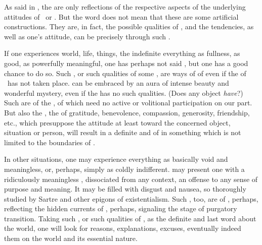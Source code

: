 {  \pa As said in , the  are only reflections of
  the respective aspects of the underlying attitudes of \yes\ or \No.  But the
  word  does not mean that these are some artificial
  constructions.  They are, in fact, the possible qualities of ,
  and the tendencies, as well as one's attitude, can be 
  precisely through such .
  
  \pa If one experiences world, life, things, the indefinite everything as
  fullness, as good, as powerfully meaningful, one has perhaps not said \yes,
  but one has a good chance to do so.  Such , or such qualities
  of some , are ways of  of  even if
  the  of \sch\ has not taken place.   
  can be embraced by an aura of intense beauty and wonderful mystery, even if
  the  has no such qualities.  (Does any object {\em have}?)
  Such  are  of the ,  of
   which need no active or volitional participation on our part.
  But also the , the  of gratitude, benevolence, compassion,
  generosity, friendship, etc., which presuppose the  attitude at least
  toward the  concerned object, situation or person, will result in
  a definite and   of  in something
  which is not limited to the boundaries of .
  
  \pa In other situations, one may experience everything as basically void and
  meaningless, or, perhaps, simply as coldly indifferent.  
   may present one with a ridiculously meaningless ,
  dissociated from any context, an offense to any sense of purpose and meaning.
  It may be filled with disgust and nausea, so thoroughly studied by Sartre and
  other epigons of existentialism.  Such , too, are 
  of , perhaps, reflecting the hidden currents of 
  \No, perhaps, signaling the stage of purgatory transition.  Taking such
  , or such qualities of , as the definite and
  last word about the world, one will look for reasons, explanations, excuses,
  eventually indeed  them on the world and its essential nature.
  
}

